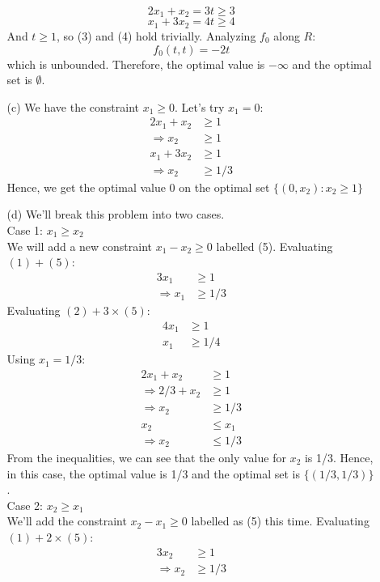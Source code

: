 \documentclass{article}
\begin{document}
\begin{itemize}
\begin{itemize}
    \[ 2 x_1 + x_2 = 3 t \ge 3 \]
    \[ x_1 + 3 x_2 = 4 t \ge 4 \]
    And $t \ge 1$, so (3) and (4) hold trivially. Analyzing $f_0$ along $R$:
    \[ f_0(t, t) = -2 t \]
    which is unbounded. Therefore, the optimal value is $-\infty$ and the optimal set is $\emptyset$.
    \item[(c)] We have the constraint $x_1 \ge 0$. Let's try $x_1 = 0$:
    \begin{align*}
      2 x_1 + x_2 &\ge 1 \\
      \Rightarrow x_2 &\ge 1 \\
      x_1 + 3 x_2 &\ge 1 \\
      \Rightarrow x_2 &\ge 1/3
    \end{align*}
    Hence, we get the optimal value 0 on the optimal set $\{(0, x_2) : x_2 \ge 1\}$
    \item[(d)] We'll break this problem into two cases. \\
    Case 1: $x_1 \ge x_2$ \\
    We will add a new constraint $x_1 - x_2 \ge 0$ labelled (5). Evaluating $(1) + (5)$:
    \begin{align*}
      3 x_1 &\ge 1 \\
      \Rightarrow x_1 &\ge 1/3
    \end{align*}
    Evaluating $(2) + 3 \times (5)$:
    \begin{align*}
      4 x_1 &\ge 1 \\
      x_1 &\ge 1/4
    \end{align*}
    Using $x_1 = 1/3$:
    \begin{align*}
      2 x_1 + x_2 &\ge 1 \\
      \Rightarrow 2/3 + x_2 &\ge 1 \\
      \Rightarrow x_2 &\ge 1/3 \\
      x_2 &\le x_1 \\
      \Rightarrow x_2 &\le 1/3
    \end{align*}
    From the inequalities, we can see that the only value for $x_2$ is 1/3. Hence, in this case, the optimal value is 1/3 and the optimal set is $\{(1/3, 1/3)\}$. \\
    Case 2: $x_2 \ge x_1$ \\
    We'll add the constraint $x_2 - x_1 \ge 0$ labelled as (5) this time. Evaluating $(1) + 2 \times (5)$:
    \begin{align*}
      3 x_2 &\ge 1 \\
      \Rightarrow x_2 &\ge 1/3
    \end{align*}

\end{itemize}
\end{itemize}
\end{document}
